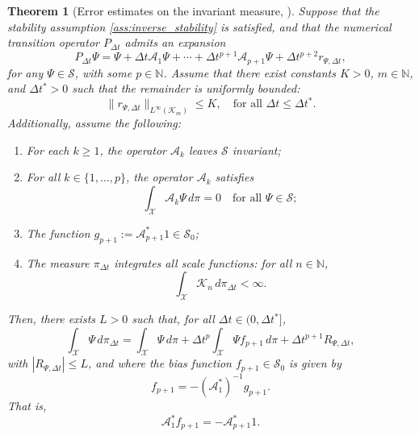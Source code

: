 \documentclass[11pt, twoside]{report}
\newtheorem{theorem}{Theorem}[section]
\begin{document}
\begin{theorem}[Error estimates on the invariant measure, \texorpdfstring{\cite[Theorem~3.3]{Lelievre2016-hx}}{}]
    \label{thm:error-inv-measure}
    Suppose that the stability assumption \ref{ass:inverse_stability} is satisfied, and that the numerical transition operator $P_{\Delta t}$ admits an expansion
    \begin{equation} \label{A_expansion}
        P_{\Delta t} \Psi = \Psi + \Delta t \mathcal{A}_1 \Psi + \cdots + \Delta t^{p+1} \mathcal{A}_{p+1} \Psi + \Delta t^{p+2} r_{\Psi,\Delta t},
    \end{equation}
    for any $\Psi \in \mathcal{S}$, with some $p \in \mathbb{N}$. Assume that there exist constants $K > 0$, $m \in \mathbb{N}$, and $\Delta t^* > 0$ such that the remainder is uniformly bounded:
    \[
    \| r_{\Psi,\Delta t} \|_{L^\infty(\mathcal{K}_m)} \leq K, \quad \text{for all } \Delta t \leq \Delta t^*.
    \]
    Additionally, assume the following:
    \begin{enumerate}
        \item For each $k \geq 1$, the operator $\mathcal{A}_k$ leaves $\mathcal{S}$ invariant;
        \item For all $k \in \{1, \ldots, p\}$, the operator $\mathcal{A}_k$ satisfies
        \begin{equation} \label{Ak_mean_zero}
            \int_\mathcal{X} \mathcal{A}_k \Psi \, d\pi = 0 \quad \text{for all } \Psi \in \mathcal{S};
        \end{equation}
        \item The function $g_{p+1} := \mathcal{A}_{p+1}^* 1 \in \mathcal{S}_0$;
        \item The measure $\pi_{\Delta t}$ integrates all scale functions: for all $n \in \mathbb{N}$,
        \[
        \int_\mathcal{X} \mathcal{K}_n \, d\pi_{\Delta t} < \infty.
        \]
    \end{enumerate}
    Then, there exists $L > 0$ such that, for all $\Delta t \in (0, \Delta t^*]$,
    \begin{equation} \label{bias_error_estimate}
        \int_\mathcal{X} \Psi \, d\pi_{\Delta t} = \int_\mathcal{X} \Psi \, d\pi + \Delta t^p \int_\mathcal{X} \Psi f_{p+1} \, d\pi + \Delta t^{p+1} R_{\Psi,\Delta t},
    \end{equation}
    with $|R_{\Psi,\Delta t}| \leq L$, and where the bias function $f_{p+1} \in \mathcal{S}_0$ is given by
    \[
    f_{p+1} = -(\mathcal{A}_1^*)^{-1} g_{p+1}.
    \]
    That is,
    \[
    \mathcal{A}_1^* f_{p+1} = -\mathcal{A}_{p+1}^* 1.
    \]
\end{theorem}
\end{document}
